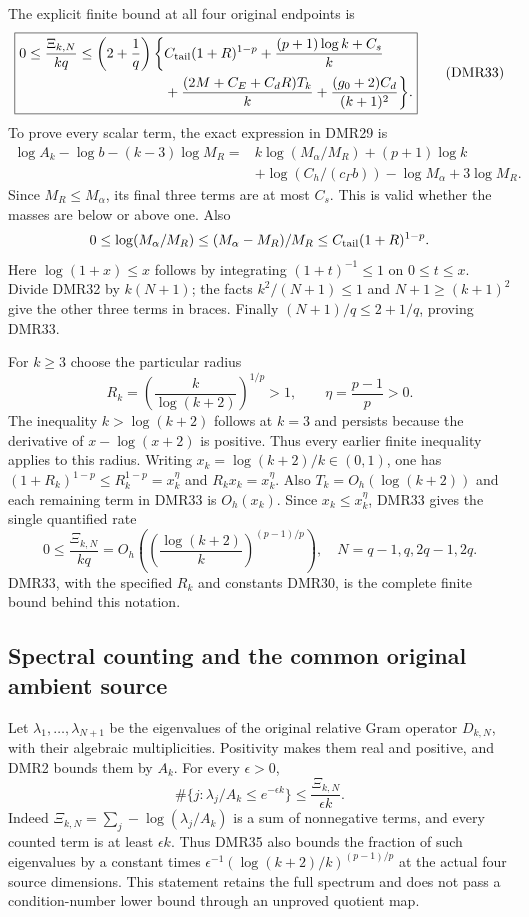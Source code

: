 The explicit finite bound at all four original endpoints is
\[
 \boxed{\begin{split}
 0\leq\frac{\Xi_{k,N}}{kq}
 \leq\left(2+\frac1q\right)\bigg\{&
 C_{\rm tail}(1+R)^{1-p}
 +\frac{(p+1)\log k+C_s}{k}\\
 &+\frac{(2M+C_E+C_dR)T_k}{k}
 +\frac{(g_0+2)C_d}{(k+1)^2}\bigg\}.
 \end{split}}\tag{DMR33}
\]
To prove every scalar term, the exact expression in DMR29 is
\[
 \begin{split}
 \log A_k-\log b-(k-3)\log M_R
  ={}&k\log(M_\alpha/M_R)+(p+1)\log k\\
     &+\log(C_h/(c_\Gamma b))-\log M_\alpha+3\log M_R.
 \end{split}
\]
Since $M_R\leq M_\alpha$, its final three terms are at most
$C_s$. This is valid whether the masses are below or above one.
Also
\[
 0\leq\log(M_\alpha/M_R)
 \leq(M_\alpha-M_R)/M_R
 \leq C_{\rm tail}(1+R)^{1-p}.
\]
Here $\log(1+x)\leq x$ follows by integrating
$(1+t)^{-1}\leq1$ on $0\leq t\leq x$.
Divide DMR32 by $k(N+1)$; the facts
$k^2/(N+1)\leq1$ and $N+1\geq(k+1)^2$ give the other
three terms in braces. Finally $(N+1)/q\leq2+1/q$,
proving DMR33.

For $k\geq3$ choose the particular radius
\[
 R_k=\left(\frac{k}{\log(k+2)}\right)^{1/p}>1,\qquad
 \eta=\frac{p-1}{p}>0.
 \tag{DMR34}
\]
The inequality $k>\log(k+2)$ follows at $k=3$ and persists
because the derivative of $x-\log(x+2)$ is positive.
Thus every earlier finite inequality applies to this radius.
Writing $x_k=\log(k+2)/k\in(0,1)$, one has
$(1+R_k)^{1-p}\leq R_k^{1-p}=x_k^\eta$ and
$R_k x_k=x_k^\eta$. Also $T_k=O_h(\log(k+2))$ and
each remaining term in DMR33 is $O_h(x_k)$.
Since $x_k\leq x_k^\eta$, DMR33 gives the single quantified rate
\[
 \boxed{\quad
 0\leq\frac{\Xi_{k,N}}{kq}
   =O_h\left(\left(\frac{\log(k+2)}{k}\right)^{(p-1)/p}\right),
 \quad N=q-1,q,2q-1,2q.
 \quad}\tag{DMR35}
\]
DMR33, with the specified $R_k$ and constants DMR30,
is the complete finite bound behind this notation.

\subsection{Spectral counting and the common original ambient source}

Let $\lambda_1,\ldots,\lambda_{N+1}$ be the eigenvalues
of the original relative Gram operator $D_{k,N}$, with their
algebraic multiplicities. Positivity makes them real and positive,
and DMR2 bounds them by $A_k$. For every $\epsilon>0$,
\[
 \boxed{\quad
 \#\{j:\lambda_j/A_k\leq e^{-\epsilon k}\}
       \leq\frac{\Xi_{k,N}}{\epsilon k}.
 \quad}\tag{DMR36}
\]
Indeed $\Xi_{k,N}=\sum_j-\log(\lambda_j/A_k)$ is a sum
of nonnegative terms, and every counted term is at least
$\epsilon k$. Thus DMR35 also bounds the fraction of such
eigenvalues by a constant times
$\epsilon^{-1}(\log(k+2)/k)^{(p-1)/p}$ at the actual
four source dimensions. This statement retains the full
spectrum and does not pass a condition-number lower bound
through an unproved quotient map.

